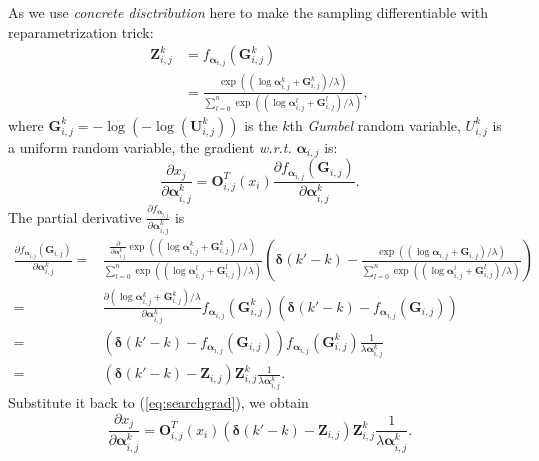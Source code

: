 \documentclass{article} \usepackage{iclr2019_conference,times}
\begin{document}
As we use \textit{concrete disctribution} here to make the sampling differentiable with reparametrization trick:
\begin{equation}
\begin{split}
\label{eq:gumbelsoftmax}
\bm{Z}_{i,j}^{k} &= f_{\bm{\alpha}_{i,j}}(\bm{G}_{i,j}^{k})\\
&= \frac{\exp ((\log \bm{\alpha}_{i,j}^{k} + \bm{G}_{i,j}^{k})/\lambda)}{\sum_{l=0}^{n}\exp ((\log \bm{\alpha}_{i,j}^{l} + \bm{G}_{i,j}^{l})/\lambda)}, 
\end{split}
\end{equation}
where $\bm{G}_{i,j}^{k} = -\log (-\log (\bm{U}_{i,j}^{k}))$ is the $k$th \textit{Gumbel} random variable, $U_{i,j}^{k}$ is a uniform random variable, the gradient \textit{w.r.t.} $\bm{\alpha}_{i,j}$ is:
\begin{equation}
\frac{\partial x_{j}}{\partial \bm{\alpha}_{i,j}^{k}} = \bm{O}_{i,j}^{T}(x_{i}) \frac{\partial f_{\bm{\alpha}_{i,j}}(\bm{G}_{i,j})}{\partial \bm{\alpha}_{i,j}^{k}}.
\label{eq:searchgrad}
\end{equation}
The partial derivative $\frac{\partial f_{\bm{\alpha}_{i,j}}}{\partial \bm{\alpha}_{i,j}^{k}}$ is
\begin{equation}
\begin{split}
\frac{\partial f_{\bm{\alpha}_{i,j}}(\bm{G}_{i,j})}{\partial \bm{\alpha}_{i,j}^{k}} 
= & \frac{\frac{\partial}{\partial \bm{\alpha}_{i,j}^{k}}\exp((\log \bm{\alpha}_{i,j}^{k} + \bm{G}_{i,j}^{k} )/\lambda)}{\sum_{l=0}^{n}\exp ((\log \bm{\alpha}_{i,j}^{l} + \bm{G}_{i,j}^{l})/\lambda)}(\bm{\delta}(k'-k)-\frac{\exp((\log \bm{\alpha}_{i,j} + \bm{G}_{i,j})/\lambda)}{\sum_{l=0}^{n}\exp ((\log \bm{\alpha}_{i,j}^{i} + \bm{G}_{i,j}^{l})/\lambda)}) \\
= & \frac{\partial (\log \bm{\alpha}_{i,j}^{k} + \bm{G}_{i,j}^{k} )/\lambda}{\partial \bm{\alpha}_{i,j}^{k}}f_{\bm{\alpha}_{i,j}}(\bm{G}_{i,j}^{k})(\bm{\delta}(k'-k)-f_{\bm{\alpha}_{i,j}}(\bm{G}_{i,j})) \\
= & (\bm{\delta}(k'-k)-f_{\bm{\alpha}_{i,j}}(\bm{G}_{i,j}))f_{\bm{\alpha}_{i,j}}(\bm{G}_{i,j}^{k})\frac{1}{\lambda\bm{\alpha}_{i,j}^{k}} \\
= & (\bm{\delta}(k'-k)-\bm{Z}_{i,j})\bm{Z}_{i,j}^{k}\frac{1}{\lambda\bm{\alpha}_{i,j}^{k}}. 
\end{split}
\end{equation}
Substitute it back to (\ref{eq:searchgrad}), we obtain
\begin{equation}
\frac{\partial x_{j}}{\partial \bm{\alpha}_{i,j}^{k}} = \bm{O}_{i,j}^{T}(x_{i}) (\bm{\delta}(k'-k)-\bm{Z}_{i,j})\bm{Z}_{i,j}^{k}\frac{1}{\lambda\bm{\alpha}_{i,j}^{k}}.
\end{equation}
\end{document}
